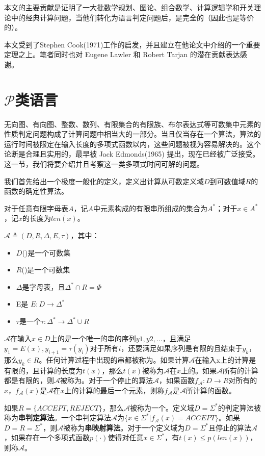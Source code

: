 \documentclass[twocolumn]{article}
\theoremstyle{nonumberplain}%
\begin{document}
\begin{CJK}{UTF8}{gbsn}
    本文的主要贡献是证明了一大批数学规划、图论、组合数学、计算逻辑学和开关理论中的经典计算问题，当他们转化为语言判定问题后，是完全的（因此也是等价的）。

    本文受到了Stephen Cook(1971)工作的启发，并且建立在他论文中介绍的一个重要定理之上。笔者同时也对 Eugene Lawler 和 Robert Tarjan 的潜在贡献表达感谢。

\section{$\mathcal{P}$类语言}
    无向图、有向图、整数、数列、有限集合的有限族、布尔表达式等可数集中元素的性质判定问题构成了计算问题中相当大的一部分。当且仅当存在一个算法，算法的运行时间被限定在输入长度的多项式函数以内，这些问题被视为容易解决的。这个论断是合理且实用的，最早被 Jack Edmonds(1965) 提出，现在已经被广泛接受。这一节，我们将要介绍并且考察这一类多项式时间可解的问题。

    我们首先给出一个极度一般化的定义，定义出计算从可数定义域$D$到可数值域$R$的函数的确定性算法。

    对于任意有限字母表$A$，记$A$中元素构成的有限串所组成的集合为$A^*$；对于$x\in A^*$，记$x$的长度为$len(x)$。

    {}$\mathcal{A}\triangleq(D,R,\Delta,E,\tau)$，其中：
    \begin{itemize}
    \item $D$({})是一个可数集
    \item $R$({})是一个可数集
    \item $\Delta$是字母表，且$\Delta^*\cap R=\Phi$
    \item E是{} $E:D\rightarrow\Delta^*$
    \item $\tau$是一个{ }$\tau:\Delta^*\rightarrow\Delta^*\cup R$
    \end{itemize}

    $\mathcal{A}$在输入$x\in D$上的{}是一个唯一的串的序列$y1,y2,...$，且满足$y_1=E(x),y_{i+1}=\tau(y_i)$对于所有$i$，还要满足如果序列是有限的且结束于$y_k$，那么$y_k\in R$。任何计算过程中出现的串都被称为{}。如果计算$\mathcal{A}$在输入x上的计算是有限的，且计算的长度为$t(x)$，那么$t(x)$被称为$\mathcal{A}$在$x$上的{}。如果$\mathcal{A}$所有的计算都是有限的，则$\mathcal{A}$被称为{}。对于一个停止的算法$\mathcal{A}$，如果函数$f_\mathcal{A}:D\rightarrow R$对所有的$x$，$f_\mathcal{A}(x)$是$\mathcal{A}$在$x$上的计算的最后一个元素，则称$f_\mathcal{A}$是$\mathcal{A}$所计算的函数。

    如果$R=\{ACCEPT,REJECT\}$，那么$\mathcal{A}$被称为一个{}。定义域$D=\Sigma^*$的判定算法被称为{\bf 串判定算法}。一个串判定算法$\mathcal{A}${}为$\{x\in\Sigma^*|f_\mathcal{A}(x)=ACCEPT\}$。如果$D=R=\Sigma^*$，则$\mathcal{A}$被称为{\bf 串映射算法}。对于一个定义域为$D=\Sigma^*$且停止的算法$\mathcal{A}$，如果存在一个多项式函数$p(\cdot)$使得对任意$x\in\Sigma^*$，有$t(x)\le p(len(x))$，则称$\mathcal{A}${}。


\end{CJK}
\end{document}
